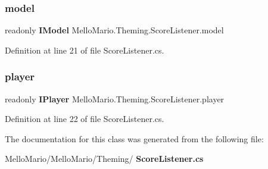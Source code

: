 \subsubsection{model}
{\footnotesize\ttfamily readonly \textbf{ I\+Model} Mello\+Mario.\+Theming.\+Score\+Listener.\+model\hspace{0.3cm}{\ttfamily [private]}}



Definition at line 21 of file Score\+Listener.\+cs.

\mbox{\label{classMelloMario_1_1Theming_1_1ScoreListener_ab985f2cd71a1a380b78a093057f93415}} 
\subsubsection{player}
{\footnotesize\ttfamily readonly \textbf{ I\+Player} Mello\+Mario.\+Theming.\+Score\+Listener.\+player\hspace{0.3cm}{\ttfamily [private]}}



Definition at line 22 of file Score\+Listener.\+cs.



The documentation for this class was generated from the following file\+:\begin{DoxyCompactItemize}
\item 
Mello\+Mario/\+Mello\+Mario/\+Theming/\textbf{ Score\+Listener.\+cs}\end{DoxyCompactItemize}
